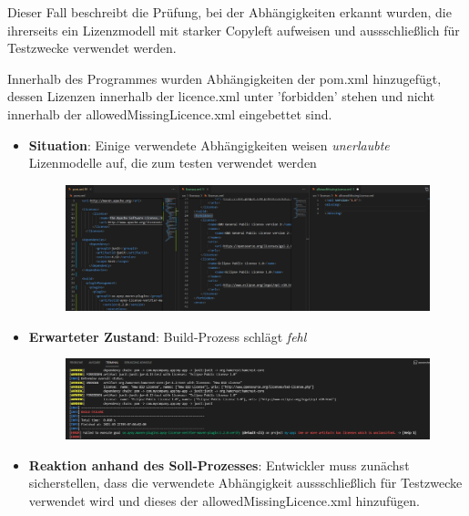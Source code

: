 Dieser Fall beschreibt die Prüfung, bei der Abhängigkeiten erkannt wurden, die ihrerseits ein Lizenzmodell mit starker Copyleft aufweisen und aussschließlich für Testzwecke verwendet werden. 

Innerhalb des Programmes wurden Abhängigkeiten der pom.xml hinzugefügt, dessen Lizenzen innerhalb der licence.xml unter 'forbidden' stehen und nicht innerhalb der allowedMissingLicence.xml eingebettet sind. 

\begin{itemize}
    \item \textbf{Situation}: Einige verwendete Abhängigkeiten weisen \textit{unerlaubte} Lizenmodelle auf, die zum testen verwendet werden
    
    \begin{figure}[h]
        \centering
        \includegraphics[scale=0.4]{Bilder/Fall5Situation.png}
    \end{figure}

    \item \textbf{Erwarteter Zustand}: Build-Prozess schlägt \textit{fehl} 

    \begin{figure}[h]
        \centering
        \includegraphics[scale=0.4]{Bilder/Fall5Zustand.png}
    \end{figure}

    \item \textbf{Reaktion anhand des Soll-Prozesses}: Entwickler muss zunächst sicherstellen, dass die verwendete Abhängigkeit aussschließlich für Testzwecke verwendet wird und dieses der allowedMissingLicence.xml hinzufügen. 
\end{itemize}
